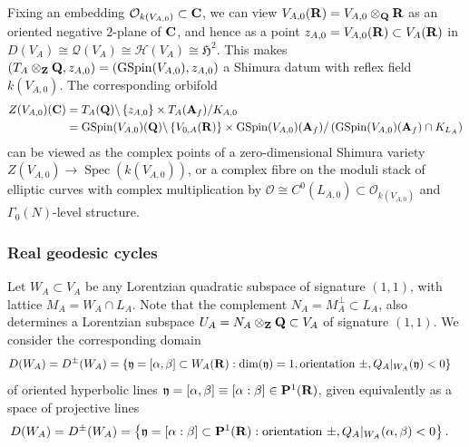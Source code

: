 \documentclass{amsart}
\theoremstyle{definition}
\theoremstyle{definition}
\theoremstyle{definition}
\begin{document}
Fixing an embedding $\mathcal{O}_{k(V_{A,0})} \subset {\bf{C}}$, we can view $V_{A,0}({\bf{R}}) = V_{A,0} \otimes_{\bf{Q}} {\bf{R}}$ 
as an oriented negative $2$-plane of ${\bf{C}}$, and hence as a point $z_{A,0} = V_{A,0}({\bf{R}}) \subset V_A({\bf{R}})$
in $D(V_A) \cong \mathcal{Q}(V_A) \cong \mathcal{H}(V_A) \cong \mathfrak{H}^2$.
This makes $(T_A \otimes_{\bf{Z}} {\bf{Q}}, z_{A, 0}) = (\operatorname{GSpin}(V_{A,0}), z_{A, 0})$ 
a Shimura datum with reflex field $k(V_{A,0})$. The corresponding orbifold 
\begin{align*} Z(V_{A,0})({\bf{C}}) &= T_A({\bf{Q}}) \backslash \left\lbrace z_{A,0} \right\rbrace \times T_A({\bf{A}}_f) / K_{A,0} \\
&= \operatorname{GSpin}(V_{A,0})({\bf{Q}}) \backslash \left\lbrace V_{0,A}({\bf{R}}) \right\rbrace \times \operatorname{GSpin}(V_{A,0})({\bf{A}}_f)/
\left( \operatorname{GSpin}(V_{A,0})({\bf{A}}_f) \cap K_{L_A}  \right)\end{align*} 
can be viewed as the complex points of a zero-dimensional Shimura variety $Z(V_{A,0}) \longrightarrow \operatorname{Spec}(k(V_{A,0}))$,
or a complex fibre on the moduli stack of elliptic curves with complex multiplication by 
$\mathcal{O} \cong C^0(L_{A,0}) \subset \mathcal{O}_{k(V_{A,0})}$ and $\Gamma_0(N)$-level structure. 

\subsubsection{Real geodesic cycles} 

Let $W_{A} \subset V_{A}$ be any Lorentzian quadratic subspace of signature $(1,1)$, with lattice $M_A = W_A \cap L_A$.
Note that the complement $N_A = M_A^{\perp} \subset L_A$, also determines a Lorentzian subspace 
$U_A = N_A \otimes_{\bf{Z}} {\bf{Q}} \subset V_A$
of signature $(1,1)$. We consider the corresponding domain 
\begin{align*} D(W_A) = D^{\pm}(W_A) 
&= \left\lbrace \mathfrak{y} = [\alpha,\beta] \subset W_A({\bf{R}}) : \dim(\mathfrak{y})=1, 
\text{orientation $\pm$}, Q_A\vert_{ W_A}(\mathfrak{y}) < 0 \right\rbrace \end{align*}
of oriented hyperbolic lines $\mathfrak{y} = [\alpha, \beta] \equiv [\alpha: \beta] \in {\bf{P}}^1({\bf{R}})$, given equivalently as a space of projective lines
\begin{align*} D(W_A) = D^{\pm}(W_A) 
&= \left\lbrace \mathfrak{y} = [\alpha: \beta] \subset {\bf{P}}^1({\bf{R}}) : \text{orientation $\pm$}, Q_A\vert_{W_A}(\alpha, \beta) < 0 \right\rbrace. \end{align*}
\end{document}
